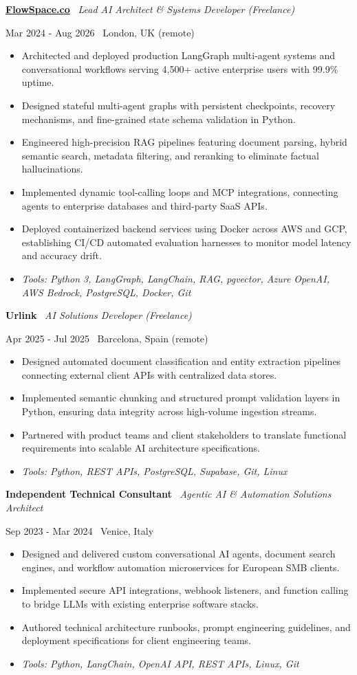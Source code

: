 \documentclass[a4paper,10pt]{article}
\newcommand{\role}[4]{%
  \vspace{2pt}\noindent
  \begin{minipage}[t]{0.70\textwidth}\raggedright\textbf{#1} \textbullet\ \textit{#3}\end{minipage}%
  \hfill
  \begin{minipage}[t]{0.28\textwidth}\raggedleft\footnotesize\color{gray}#2 \textbullet\ #4\end{minipage}%
  \vspace{1pt}%
}
\begin{document}
\role{\href{https://flowspace.co}{FlowSpace.co}}{Mar 2024 - Aug 2026}{Lead AI Architect \& Systems Developer (Freelance)}{London, UK (remote)}
\begin{itemize}
  \item Architected and deployed production LangGraph multi-agent systems and conversational workflows serving 4,500+ active enterprise users with 99.9\% uptime.
  \item Designed stateful multi-agent graphs with persistent checkpoints, recovery mechanisms, and fine-grained state schema validation in Python.
  \item Engineered high-precision RAG pipelines featuring document parsing, hybrid semantic search, metadata filtering, and reranking to eliminate factual hallucinations.
  \item Implemented dynamic tool-calling loops and MCP integrations, connecting agents to enterprise databases and third-party SaaS APIs.
  \item Deployed containerized backend services using Docker across AWS and GCP, establishing CI/CD automated evaluation harnesses to monitor model latency and accuracy drift.
  \item \textit{Tools: Python 3, LangGraph, LangChain, RAG, pgvector, Azure OpenAI, AWS Bedrock, PostgreSQL, Docker, Git}
\end{itemize}

\role{Urlink}{Apr 2025 - Jul 2025}{AI Solutions Developer (Freelance)}{Barcelona, Spain (remote)}
\begin{itemize}
  \item Designed automated document classification and entity extraction pipelines connecting external client APIs with centralized data stores.
  \item Implemented semantic chunking and structured prompt validation layers in Python, ensuring data integrity across high-volume ingestion streams.
  \item Partnered with product teams and client stakeholders to translate functional requirements into scalable AI architecture specifications.
  \item \textit{Tools: Python, REST APIs, PostgreSQL, Supabase, Git, Linux}
\end{itemize}

\role{Independent Technical Consultant}{Sep 2023 - Mar 2024}{Agentic AI \& Automation Solutions Architect}{Venice, Italy}
\begin{itemize}
  \item Designed and delivered custom conversational AI agents, document search engines, and workflow automation microservices for European SMB clients.
  \item Implemented secure API integrations, webhook listeners, and function calling to bridge LLMs with existing enterprise software stacks.
  \item Authored technical architecture runbooks, prompt engineering guidelines, and deployment specifications for client engineering teams.
  \item \textit{Tools: Python, LangChain, OpenAI API, REST APIs, Linux, Git}
\end{itemize}
\end{document}
